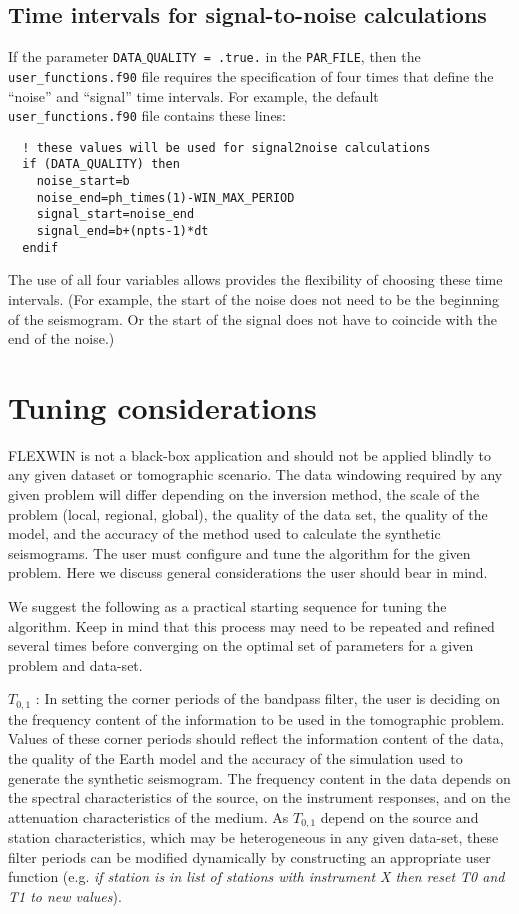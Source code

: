 
\subsection{Time intervals for signal-to-noise calculations}

If the parameter {\tt DATA$\_$QUALITY = .true.} in the {\tt PAR$\_$FILE}, then the {\tt user\_functions.f90} file requires the specification of four times that define the ``noise'' and ``signal'' time intervals.  For example, the default {\tt user\_functions.f90} file contains these lines:
%
\begin{verbatim}
  ! these values will be used for signal2noise calculations
  if (DATA_QUALITY) then
    noise_start=b
    noise_end=ph_times(1)-WIN_MAX_PERIOD
    signal_start=noise_end
    signal_end=b+(npts-1)*dt
  endif
\end{verbatim}
%
The use of all four variables allows provides the flexibility of choosing these time intervals.  (For example, the start of the noise does not need to be the beginning of the seismogram. Or the start of the signal does not have to coincide with the end of the noise.)



\section{Tuning considerations}
FLEXWIN is not a black-box application and should not be applied blindly
to any given dataset or tomographic scenario.  The data windowing required by
any given problem will differ depending on the inversion method, the scale of
the problem (local, regional, global), the quality of the data set, the quality of the model,
and the accuracy of the method used to calculate the synthetic seismograms.  The user
must configure and tune the algorithm for the given problem.  Here we
discuss general considerations the user should bear in mind.

We suggest the following as a practical starting sequence for tuning the algorithm.
Keep in mind that this process may need to be repeated and refined several times before
converging on the optimal set of parameters for a given problem and data-set.

$T_{0,1}$ : In setting the corner periods of the bandpass filter, the
user is deciding on the frequency content of the information to be used in the
tomographic problem.  Values of these corner periods should reflect the
information content of the data, the quality of the Earth model and the
accuracy of the simulation used to generate the synthetic seismogram.  The
frequency content in the data depends on the spectral characteristics of the
source, on the instrument responses, and on the attenuation
characteristics of the medium. As $T_{0,1}$ depend on the source and station
characteristics, which may be heterogeneous in any given data-set, these filter
periods can be modified dynamically by constructing an appropriate user
function (e.g. {\em if station is in list of stations with instrument X then
reset T0 and T1 to new values}).


